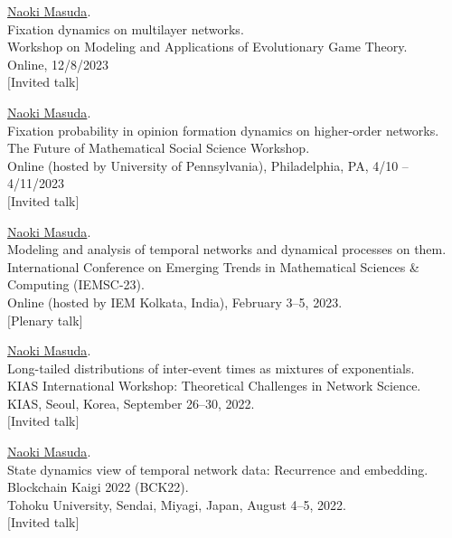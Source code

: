 \documentclass[11pt,letter]{article}
\begin{document}
\begin{etaremune}

\item \underline{Naoki Masuda}.\\
Fixation dynamics on multilayer networks.\\
Workshop on Modeling and Applications of Evolutionary Game Theory.\\
Online, 12/8/2023\\
$[$Invited talk$]$


\item \underline{Naoki Masuda}.\\
Fixation probability in opinion formation dynamics on higher-order networks.\\
The Future of Mathematical Social Science Workshop.\\
Online (hosted by University of Pennsylvania), Philadelphia, PA, 4/10 -- 4/11/2023\\
$[$Invited talk$]$


\item \underline{Naoki Masuda}.\\
Modeling and analysis of temporal networks and dynamical processes on them.\\
International Conference on Emerging Trends in Mathematical Sciences \& Computing (IEMSC-23).\\ 
Online (hosted by IEM Kolkata, India), February 3--5, 2023.\\
$[$Plenary talk$]$

\item \underline{Naoki Masuda}.\\
Long-tailed distributions of inter-event times as mixtures of exponentials.\\
KIAS International Workshop: Theoretical Challenges in Network Science.\\
KIAS, Seoul, Korea, September 26--30, 2022.\\
$[$Invited talk$]$

\item \underline{Naoki Masuda}.\\
State dynamics view of temporal network data: Recurrence and embedding.\\
Blockchain Kaigi 2022 (BCK22).\\
Tohoku University, Sendai, Miyagi, Japan, August 4--5, 2022.\\
$[$Invited talk$]$


\end{etaremune}
\end{document}

